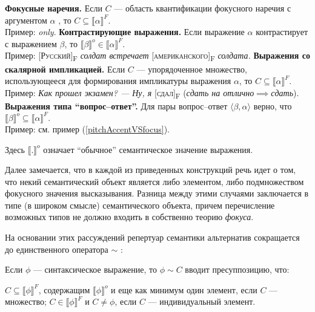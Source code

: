 \documentclass[a4paper, titlepage, 12pt]{article}
\begin{document}
\begin{exe}
    \ex \begin{xlist} \label{focusConstructions}
        \ex \textbf{Фокусные наречия.} Если $ C $ --- область квантификации фокусного наречия с аргументом $ \alpha $ , то $ C \subseteq \llbracket \alpha \rrbracket^{F}. $ \\ Пример: \textit{only}.
        \ex \textbf{Контрастирующие выражения.} Если выражение $ \alpha $ контрастирует с выражением $ \beta $, то $ \llbracket \beta \rrbracket^{o} \in \llbracket \alpha \rrbracket^{F}. $ \\ Пример: [\textsc{Русский}]\textsubscript{F} \textit{солдат встречает} [\textsc{американского}]\textsubscript{F} \textit{солдата.}
        \ex \textbf{Выражения со скалярной импликацией.} Если $ C $ --- упорядоченное множество, использующееся для формирования импликатуры выражения $ \alpha $, то $ C \subseteq \llbracket \alpha \rrbracket^{F}. $ \\ Пример: \textit{Как прошел экзамен? --- Ну, я} [\textsc{сдал}]\textsubscript{F} (\textit{сдать на отлично}$ \implies $\textit{сдать}).
        \ex \textbf{Выражения типа ``вопрос--ответ''.} Для пары вопрос--ответ $ \langle \beta, \alpha \rangle $ верно, что $ \llbracket \beta \rrbracket^{o}  \subseteq \llbracket \alpha \rrbracket^{F}. $ \\ Пример: см. пример (\ref{pitchAccentVSfocus}).
    \end{xlist}
\end{exe}

Здесь $ \llbracket . \rrbracket^{o} $ означает ``обычное'' семантическое значение выражения.

\medskip

Далее замечается, что в каждой из приведенных конструкций речь идет о том, что некий семантический объект является либо элементом, либо подмножеством фокусного значения высказывания. Разница между этими случаями заключается в типе (в широком смысле) семантического объекта, причем перечисление возможных типов не должно входить в собственно теорию \textit{фокуса}.

\medskip

На основании этих рассуждений репертуар семантики альтернатив сокращается до единственного оператора $ \sim $ \citep{rooth1992theory}:

\begin{exe} 
    \ex \label{tildaOperator} Если $ \phi $ --- синтаксическое выражение, то $ \phi \sim C $ вводит пресуппозицию, что:
    \begin{xlist}
        \ex $ C \subseteq \llbracket \phi \rrbracket^{F} $, содержащим $ \llbracket \phi \rrbracket^{o} $ и еще как минимум один элемент, если $ C $ --- множество;
        \ex $ C \in \llbracket \phi \rrbracket^{F} $ и $ C \neq \phi $, если $ C $ --- индивидуальный элемент.
    \end{xlist}
\end{exe}
\end{document}
